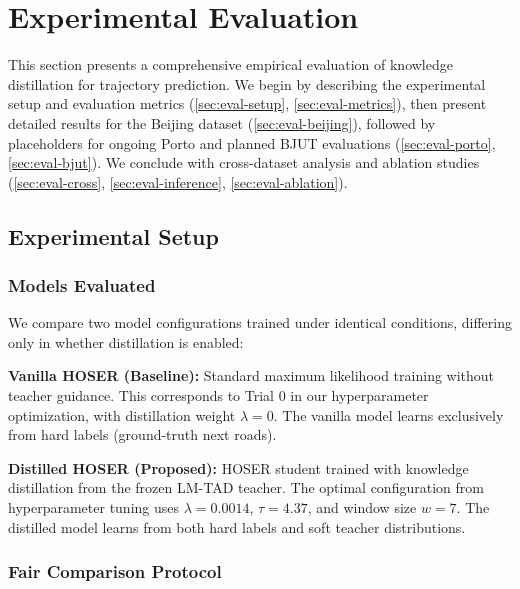 
\section{Experimental Evaluation}
\label{sec:evaluation}

This section presents a comprehensive empirical evaluation of knowledge distillation for trajectory prediction. We begin by describing the experimental setup and evaluation metrics (\autoref{sec:eval-setup}, \autoref{sec:eval-metrics}), then present detailed results for the Beijing dataset (\autoref{sec:eval-beijing}), followed by placeholders for ongoing Porto and planned BJUT evaluations (\autoref{sec:eval-porto}, \autoref{sec:eval-bjut}). We conclude with cross-dataset analysis and ablation studies (\autoref{sec:eval-cross}, \autoref{sec:eval-inference}, \autoref{sec:eval-ablation}).

\subsection{Experimental Setup}
\label{sec:eval-setup}

\subsubsection{Models Evaluated}

We compare two model configurations trained under identical conditions, differing only in whether distillation is enabled:

\textbf{Vanilla HOSER (Baseline):} Standard maximum likelihood training without teacher guidance. This corresponds to Trial 0 in our hyperparameter optimization, with distillation weight $\lambda = 0$. The vanilla model learns exclusively from hard labels (ground-truth next roads).

\textbf{Distilled HOSER (Proposed):} HOSER student trained with knowledge distillation from the frozen LM-TAD teacher. The optimal configuration from hyperparameter tuning uses $\lambda = 0.0014$, $\tau = 4.37$, and window size $w = 7$. The distilled model learns from both hard labels and soft teacher distributions.

\subsubsection{Fair Comparison Protocol}

